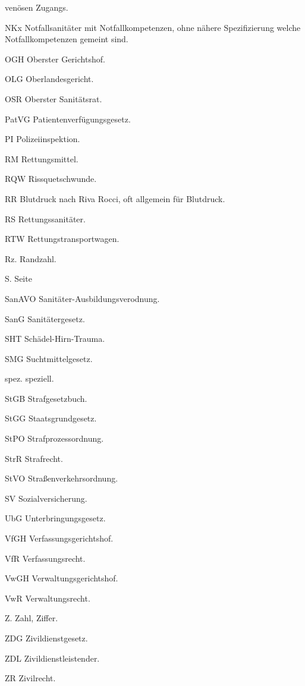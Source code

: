 \documentclass[
ngerman,
paper=a4,
asymmetric,
fontsize=9pt,
headings=small,
draft=false,
parskip=false,
footnotes=multiple,
]{scrbook}
\begin{document}
\begin{gWideParEnv}
\begin{multicols}{3}
{\begin{compactdesc}
    ven\"osen Zugangs. 
    \item[NKx] Notfallsanitäter mit Notfallkompetenzen, ohne nähere
    Spezifizierung welche Notfallkompetenzen gemeint sind. 
    \item[OGH]  Oberster Gerichtshof. 
    \item[OLG] Oberlandesgericht. 
    \item[OSR]  Oberster Sanitätsrat. 
    \item[PatVG]  Patientenverfügungsgesetz. 
    \item[PI] Polizeiinspektion. 
    \item[RM] Rettungsmittel. 
    \item[RQW]  Rissquetschwunde. 
    \item[RR] Blutdruck nach Riva Rocci, oft allgemein für Blutdruck.
    \item[RS]  Rettungssanitäter. 
    \item[RTW]  Rettungstransportwagen. 
    \item[Rz.] Randzahl. 
    \item[S.] Seite
    \item[SanAVO] Sanitäter-Ausbildungsverodnung. 
    \item[SanG]  Sanitätergesetz. 
    \item[SHT] Schädel-Hirn-Trauma. 
    \item[SMG] Suchtmittelgesetz. 
    \item[spez.] speziell. 
    \item[StGB]  Strafgesetzbuch. 
    \item[StGG]  Staatsgrundgesetz. 
    \item[StPO]  Strafprozessordnung. 
    \item[StrR]  Strafrecht. 
    \item[StVO]  Stra{\ss}enverkehrsordnung. 
    \item[SV]  Sozialversicherung. 
    \item[UbG]  Unterbringungsgesetz. 
    \item[VfGH]  Verfassungsgerichtshof. 
    \item[VfR]  Verfassungsrecht. 
    \item[VwGH]  Verwaltungsgerichtshof. 
    \item[VwR]  Verwaltungsrecht. 
    \item[Z.] Zahl, Ziffer.
    \item[ZDG]  Zivildienstgesetz. 
    \item[ZDL] Zivildienstleistender. 
    \item[ZR]  Zivilrecht. 
\end{compactdesc}
}

\end{multicols}
\end{gWideParEnv}
\end{document}

